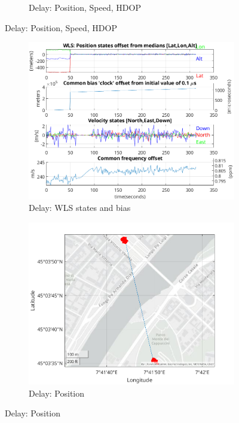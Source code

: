 \begin{figure}[h!]
\begin{subfigure}{0.23\textwidth}
                \caption{Delay: Position, Speed, HDOP}
            \end{subfigure}
        \end{figure}

                \begin{figure}[h!]
            \centering
            \begin{subfigure}{0.23\textwidth}
                \includegraphics[width=\textwidth]{images/tests/Monte_Cappuccini/Spoofing/task6_figures/Samsung_A51_Monte_Cappuccini_fig5.png}
                \caption{Delay: WLS states and bias}
            \end{subfigure}
            \hfill
            \begin{subfigure}{0.23\textwidth}
                \includegraphics[width=\textwidth]{images/tests/Monte_Cappuccini/Spoofing/task6_figures/Samsung_A51_Monte_Cappuccini_fig6.png}
                \caption{Delay: Position}
            \end{subfigure}
        \end{figure}

